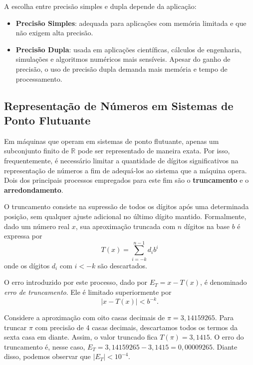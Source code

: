 A escolha entre precisão simples e dupla depende da aplicação:



\begin{itemize}
  \item \textbf{Precisão Simples}: adequada para aplicações com memória limitada e que não exigem alta precisão.
  \item \textbf{Precisão Dupla}: usada em aplicações científicas, cálculos de engenharia, simulações e algoritmos numéricos mais sensíveis.
Apesar do ganho de precisão, o uso de precisão dupla demanda mais memória e tempo de processamento.


\end{itemize}



\newpage
\subsection{Representação de Números em Sistemas de Ponto Flutuante}

Em máquinas que operam em sistemas de ponto flutuante, apenas um subconjunto finito de \(\mathbb{R} \) pode ser representado de maneira exata. Por isso, frequentemente, é necessário limitar a quantidade de dígitos significativos na representação de números a fim de  adequá-los ao sistema que a máquina opera. Dois dos principais processos empregados para este fim são o \textbf{truncamento} e o \textbf{arredondamento}.

O truncamento consiste na supressão de todos os dígitos após uma determinada posição, sem qualquer ajuste adicional no último dígito mantido. Formalmente, dado um número real \( x \), sua aproximação truncada com \( n \) dígitos na base \( b \) é expressa por
\[
T(x) = \sum_{i = -k}^{n-1} d_i b^i
\]
onde os dígitos \( d_i \) com \( i < -k \) são descartados.

O erro introduzido por este processo, dado por $E_T = x-T(x)$, é denominado \textit{erro de truncamento}. Ele é limitado superiormente por
\begin{equation}
    |x - T(x)| < b^{-k}.
\end{equation}
\begin{ex}
Considere a aproximação com oito casas decimais de \(\pi = 3,14159265\).
Para truncar $\pi$  com precisão de 4 casas decimais, descartamos todos os termos da sexta casa em diante. Assim, o valor truncado fica
$T(\pi) = 3,1415$.
O erro do truncamento é, nesse caso, $E_T = 3,14159265 - 3,1415 = 0,00009265$. Diante disso, podemos observar que $|E_T| < 10^{-4}$.
\end{ex}

